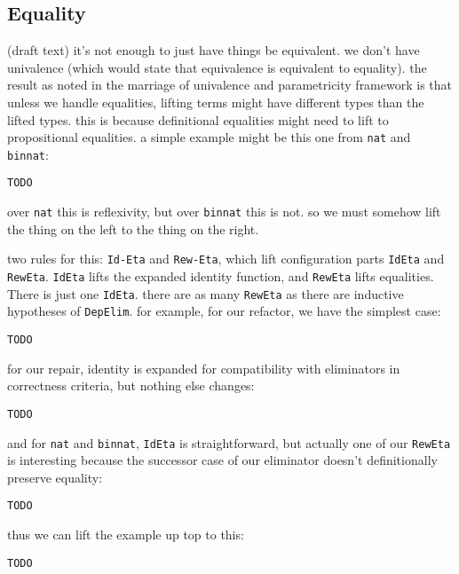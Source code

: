 \subsection{Equality}
\label{sec:equality}

(draft text) it's not enough to just have things be equivalent.
we don't have univalence (which would state that equivalence is equivalent to equality).
the result as noted in the marriage of univalence and parametricity framework is that unless we handle equalities,
lifting terms might have different types than the lifted types.
this is because definitional equalities might need to lift to propositional equalities.
a simple example might be this one from \lstinline{nat} and \lstinline{binnat}:

\begin{lstlisting}
TODO
\end{lstlisting}
over \lstinline{nat} this is reflexivity, but over \lstinline{binnat} this is not.
so we must somehow lift the thing on the left to the thing on the right.

two rules for this: \lstinline{Id-Eta} and \lstinline{Rew-Eta}, which lift
configuration parts \lstinline{IdEta} and \lstinline{RewEta}.
\lstinline{IdEta} lifts the expanded identity function, and \lstinline{RewEta} lifts equalities.
There is just one \lstinline{IdEta}. there are as many \lstinline{RewEta} as there are inductive hypotheses
of \lstinline{DepElim}.
for example, for our refactor, we have the simplest case:

\begin{lstlisting}
TODO
\end{lstlisting}
for our repair, identity is expanded for compatibility with eliminators in correctness criteria, but nothing else changes:

\begin{lstlisting}
TODO
\end{lstlisting}
and for \lstinline{nat} and \lstinline{binnat}, \lstinline{IdEta} is straightforward, but actually one of our \lstinline{RewEta}
is interesting because the successor case of our eliminator doesn't definitionally preserve equality:

\begin{lstlisting}
TODO
\end{lstlisting}
thus we can lift the example up top to this:

\begin{lstlisting}
TODO
\end{lstlisting}

